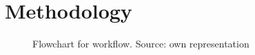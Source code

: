 \chapter{Methodology}
\label{ch:methodology}
\begin{figure}[htbp]
    \centering
    
    \caption[Flowchart for workflow]{Flowchart for workflow. Source: own representation}
    \label{fig:Flowchart}
\end{figure}






